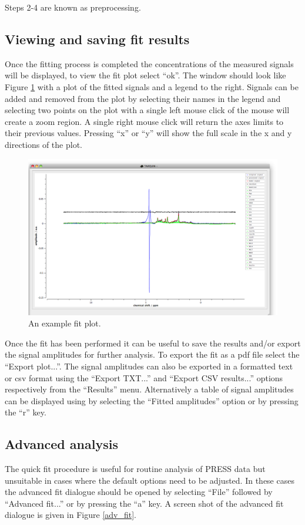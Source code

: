 \documentclass[a4paper,12pt]{article}
\begin{document}
Steps 2-4 are known as preprocessing.

\subsection{Viewing and saving fit results}
Once the fitting process is completed the concentrations of the measured signals will be displayed, to view the fit plot select ``ok''.  The window should look like Figure \ref{eg_plot} with a plot of the fitted signals and a legend to the right.  Signals can be added and removed from the plot by selecting their names in the legend and selecting two points on the plot with a single left mouse click of the mouse will create a zoom region.  A single right mouse click will return the axes limits to their previous values. Pressing ``x'' or ``y'' will show the full scale in the x and y directions of the plot.

\begin{figure}[h!]
\centering
\includegraphics[width=\textwidth]{figs/fit_example.png}
\caption{An example fit plot.}
\label{eg_plot}
\end{figure}

Once the fit has been performed it can be useful to save the results and/or export the signal amplitudes for further analysis. To export the fit as a pdf file select the ``Export plot...''.  The signal amplitudes can also be exported in a formatted text or csv format using the ``Export TXT...'' and ``Export CSV results...'' options respectively from the ``Results'' menu.  Alternatively a table of signal amplitudes can be displayed using by selecting the ``Fitted amplitudes'' option or by pressing the ``r'' key.

\subsection{Advanced analysis}
The quick fit procedure is useful for routine analysis of PRESS data but unsuitable in cases where the default options need to be adjusted.  In these cases the advanced fit dialogue should be opened by selecting ``File'' followed by ``Advanced fit...'' or by pressing the ``a'' key.  A screen shot of the advanced fit dialogue is given in Figure \ref{adv_fit}.
\end{document}
